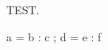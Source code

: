 \documentclass{article}
\begin{document}
TEST.

\begin{foo}
	a = b : c ;
	d = e : f
\end{foo}
\end{document}
